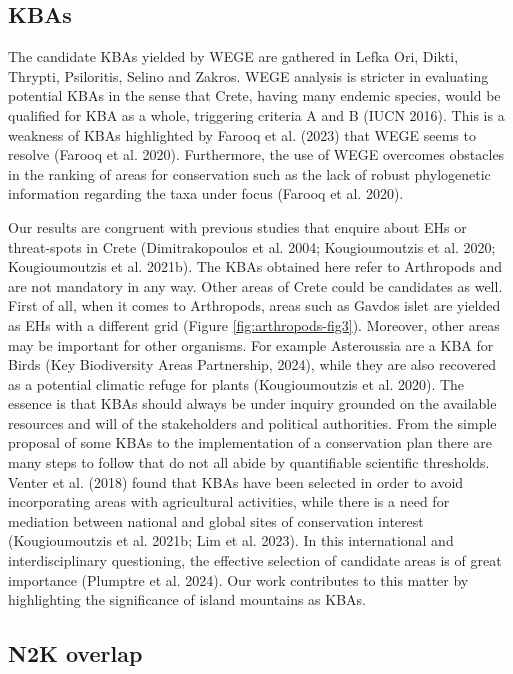     \subsection{KBAs}
    \label{subsec:arthropods-KBAs}
    
The candidate KBAs yielded by WEGE are gathered in Lefka Ori, Dikti, Thrypti,
Psiloritis, Selino and Zakros. WEGE analysis is stricter in evaluating
potential KBAs in the sense that Crete, having many endemic species, would be
qualified for KBA as a whole, triggering criteria A and B (IUCN 2016).
This is a weakness of KBAs highlighted by Farooq et al. (2023) that WEGE seems
to resolve (Farooq et al. 2020). Furthermore, the use of WEGE overcomes
obstacles in the ranking of areas for conservation such as the lack of robust
phylogenetic information regarding the taxa under focus (Farooq et al. 2020).

Our results are congruent with previous studies that enquire about EHs or
threat-spots in Crete (Dimitrakopoulos et al. 2004; Kougioumoutzis et al. 2020; Kougioumoutzis et al. 2021b).
The KBAs obtained here refer to Arthropods and are not mandatory in any way.
Other areas of Crete could be candidates as well. First of all, when it comes to
Arthropods, areas such as Gavdos islet are yielded as EHs with a different grid (Figure \ref{fig:arthropods-fig3}).
Moreover, other areas may be important for other organisms. For example Asteroussia
are a KBA for Birds (Key Biodiversity Areas Partnership, 2024), while they are
also recovered as a potential climatic refuge for plants (Kougioumoutzis et al. 2020).
The essence is that KBAs should always be under inquiry grounded on the available
resources and will of the stakeholders and political authorities. From the
simple proposal of some KBAs to the implementation of a conservation plan there
are many steps to follow that do not all abide by quantifiable scientific
thresholds. Venter et al. (2018) found that KBAs have been selected in order to
avoid incorporating areas with agricultural activities, while there is a need
for mediation between national and global sites of conservation
interest (Kougioumoutzis et al. 2021b; Lim et al. 2023). In this international
and interdisciplinary questioning, the effective selection of candidate areas
is of great importance (Plumptre et al. 2024). Our work contributes to this
matter by highlighting the significance of island mountains as KBAs.

    \subsection{N2K overlap}
    \label{subsec:arthropods-N2K-overlap}

